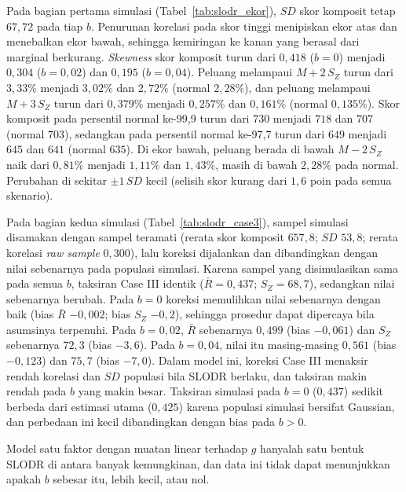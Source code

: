 Pada bagian pertama simulasi (Tabel~\ref{tab:slodr_ekor}), $SD$ skor komposit tetap $67,72$ pada tiap $b$. Penurunan korelasi pada skor tinggi menipiskan ekor atas dan menebalkan ekor bawah, sehingga kemiringan ke kanan yang berasal dari marginal berkurang. \textit{Skewness} skor komposit turun dari $0,418$ ($b = 0$) menjadi $0,304$ ($b = 0,02$) dan $0,195$ ($b = 0,04$). Peluang melampaui $M + 2\,S_Z$ turun dari $3,33\%$ menjadi $3,02\%$ dan $2,72\%$ (normal $2,28\%$), dan peluang melampaui $M + 3\,S_Z$ turun dari $0,379\%$ menjadi $0,257\%$ dan $0,161\%$ (normal $0,135\%$). Skor komposit pada persentil normal ke-99,9 turun dari $730$ menjadi $718$ dan $707$ (normal $703$), sedangkan pada persentil normal ke-97,7 turun dari $649$ menjadi $645$ dan $641$ (normal $635$). Di ekor bawah, peluang berada di bawah $M - 2\,S_Z$ naik dari $0,81\%$ menjadi $1,11\%$ dan $1,43\%$, masih di bawah $2,28\%$ pada normal. Perubahan di sekitar $\pm 1\,SD$ kecil (selisih skor kurang dari $1,6$ poin pada semua skenario).



Pada bagian kedua simulasi (Tabel~\ref{tab:slodr_case3}), sampel simulasi disamakan dengan sampel teramati (rerata skor komposit $657,8$; $SD$ $53,8$; rerata korelasi \textit{raw sample} $0,300$), lalu koreksi dijalankan dan dibandingkan dengan nilai sebenarnya pada populasi simulasi. Karena sampel yang disimulasikan sama pada semua $b$, taksiran Case III identik ($\bar{R} = 0,437$; $S_Z = 68,7$), sedangkan nilai sebenarnya berubah. Pada $b = 0$ koreksi memulihkan nilai sebenarnya dengan baik (bias $\bar{R}$ $-0,002$; bias $S_Z$ $-0,2$), sehingga prosedur dapat dipercaya bila asumsinya terpenuhi. Pada $b = 0,02$, $\bar{R}$ sebenarnya $0,499$ (bias $-0,061$) dan $S_Z$ sebenarnya $72,3$ (bias $-3,6$). Pada $b = 0,04$, nilai itu masing-masing $0,561$ (bias $-0,123$) dan $75,7$ (bias $-7,0$). Dalam model ini, koreksi Case III menaksir rendah korelasi dan $SD$ populasi bila SLODR berlaku, dan taksiran makin rendah pada $b$ yang makin besar. Taksiran simulasi pada $b = 0$ ($0,437$) sedikit berbeda dari estimasi utama ($0,425$) karena populasi simulasi bersifat Gaussian, dan perbedaan ini kecil dibandingkan dengan bias pada $b > 0$.



Model satu faktor dengan muatan linear terhadap $g$ hanyalah satu bentuk SLODR di antara banyak kemungkinan, dan data ini tidak dapat menunjukkan apakah $b$ sebesar itu, lebih kecil, atau nol.

